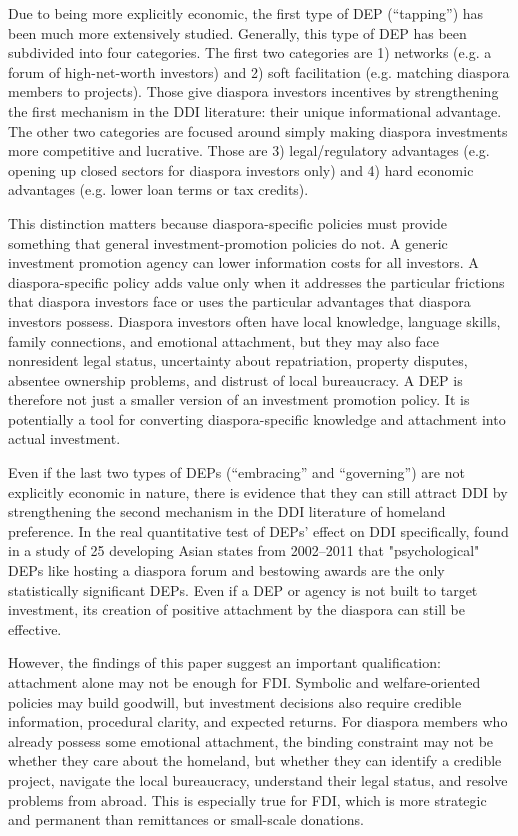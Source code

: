 \documentclass[doublespace,nopageskip]{UVAthesis}
\begin{document}
Due to being more explicitly economic, the first type of DEP (``tapping'') has been much more extensively studied. Generally, this type of DEP has been subdivided into four categories. The first two categories are 1) networks (e.g. a forum of high-net-worth investors) and 2) soft facilitation (e.g. matching diaspora members to projects). Those give diaspora investors incentives by strengthening the first mechanism in the DDI literature: their unique informational advantage. The other two categories are focused around simply making diaspora investments more competitive and lucrative. Those are 3) legal/regulatory advantages (e.g. opening up closed sectors for diaspora investors only) and 4) hard economic advantages (e.g. lower loan terms or tax credits).

This distinction matters because diaspora-specific policies must provide something that general investment-promotion policies do not. A generic investment promotion agency can lower information costs for all investors. A diaspora-specific policy adds value only when it addresses the particular frictions that diaspora investors face or uses the particular advantages that diaspora investors possess. Diaspora investors often have local knowledge, language skills, family connections, and emotional attachment, but they may also face nonresident legal status, uncertainty about repatriation, property disputes, absentee ownership problems, and distrust of local bureaucracy. A DEP is therefore not just a smaller version of an investment promotion policy. It is potentially a tool for converting diaspora-specific knowledge and attachment into actual investment.

Even if the last two types of DEPs (``embracing'' and ``governing'') are not explicitly economic in nature, there is evidence that they can still attract DDI by strengthening the second mechanism in the DDI literature of homeland preference. In the real quantitative test of DEPs' effect on DDI specifically, \citet{park_courting_2021} found in a study of 25 developing Asian states from 2002--2011 that "psychological" DEPs like hosting a diaspora forum and bestowing awards are the only statistically significant DEPs. Even if a DEP or agency is not built to target investment, its creation of positive attachment by the diaspora can still be effective.

However, the findings of this paper suggest an important qualification: attachment alone may not be enough for FDI. Symbolic and welfare-oriented policies may build goodwill, but investment decisions also require credible information, procedural clarity, and expected returns. For diaspora members who already possess some emotional attachment, the binding constraint may not be whether they care about the homeland, but whether they can identify a credible project, navigate the local bureaucracy, understand their legal status, and resolve problems from abroad. This is especially true for FDI, which is more strategic and permanent than remittances or small-scale donations.
\end{document}
